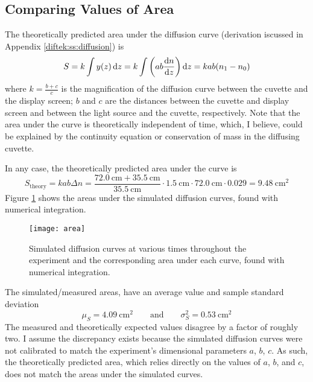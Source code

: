 \documentclass[11pt, a4paper]{article}
\newcommand{\diff}{\mathop{}\!\mathrm{d}} %
\newcommand{\eqtext}[1]{\qquad \text{#1} \qquad}
\begin{document}
\subsection{Comparing Values of Area}
The theoretically predicted area under the diffusion curve (derivation iscussed in Appendix \ref{diftek:ss:diffusion}) is
\begin{equation*}
	S = k\int y(z) \diff z = k\int \left(ab \dv{n}{z}\right)\diff z = k ab (n_{1}- n_{0})
\end{equation*}
where $ k = \frac{b+c}{c} $ is the magnification of the diffusion curve between the cuvette and the display screen; $ b $ and $ c $ are the distances between the cuvette and display screen and between the light source and the cuvette, respectively. Note that the area under the curve is theoretically independent of time, which, I believe, could be explained by the continuity equation or conservation of mass in the diffusing cuvette. 

\vspace{2mm}
In any case, the theoretically predicted area under the curve is
\begin{equation*}
	S_{\text{theory}} = k a b \Delta n = \frac{\SI{72.0}{\centi \meter} + \SI{35.5}{\centi \meter}}{\SI{35.5}{\centi \meter}} \cdot \SI{1.5}{\centi \meter} \cdot \SI{72.0}{\centi \meter} \cdot 0.029 = \boxed{\SI{9.48}{\centi \meter^{2}}}
\end{equation*}
Figure \ref{diftek:fig:area} shows the areas under the simulated diffusion curves, found with numerical integration. 
 
\begin{figure}[htb!]
\texttt{[image: area]}
\caption{Simulated diffusion curves at various times throughout the experiment and the corresponding area under each curve, found with numerical integration.}
\label{diftek:fig:area}
\end{figure}

The simulated/measured areas, have an average value and sample standard deviation
\begin{equation*}
	\mu_{S} = \SI{4.09}{\centi \meter^{2}} \eqtext{and} \sigma_{S}^{2} = \SI{0.53}{\centi \meter^{2}}
\end{equation*}
The measured and theoretically expected values disagree by a factor of roughly two. I assume the discrepancy exists because the simulated diffusion curves were not calibrated to match the experiment's dimensional parameters $ a $, $ b $, $ c $. As such, the theoretically predicted area, which relies directly on the values of $ a $, $ b $, and $ c $, does not match the areas under the simulated curves.
\end{document}
